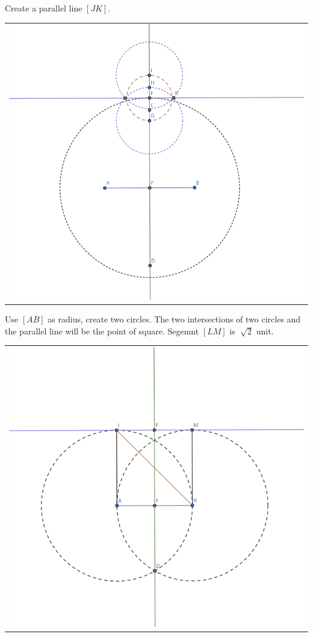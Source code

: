 \documentclass[letter,12pt]{article}
\begin{document}
Create a parallel line $[JK]$.
\begin{center}
	\begin{tabular}{c}
		\includegraphics[width=0.7\columnwidth]{Q1B_2.png} \\
	\end{tabular}
\end{center}

Use $[AB]$ as radius, create two circles. The two intersections of two circles and the parallel line will be the point of square. Segemnt $[LM]$ is $\sqrt[]{2}$ unit.
\begin{center}
	\begin{tabular}{c}
		\includegraphics[width=0.7\columnwidth]{Q1B_3.png} \\
	\end{tabular}
\end{center}
\end{document}
